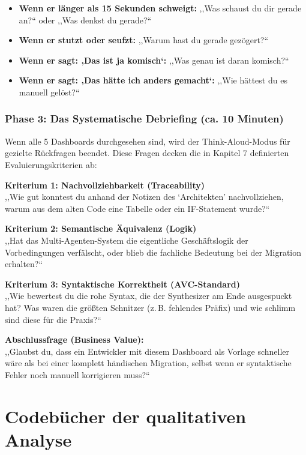 \documentclass[12pt, a4paper, oneside]{book}
\begin{document}
\begin{itemize}
    \item \textbf{Wenn er länger als 15 Sekunden schweigt:} ,,Was schaust du dir gerade an?`` oder ,,Was denkst du gerade?``
    \item \textbf{Wenn er stutzt oder seufzt:} ,,Warum hast du gerade gezögert?``
    \item \textbf{Wenn er sagt: ,Das ist ja komisch`:} ,,Was genau ist daran komisch?``
    \item \textbf{Wenn er sagt: ,Das hätte ich anders gemacht`:} ,,Wie hättest du es manuell gelöst?``
\end{itemize}

\subsection*{Phase 3: Das Systematische Debriefing (ca. 10 Minuten)}
Wenn alle 5 Dashboards durchgesehen sind, wird der Think-Aloud-Modus für gezielte Rückfragen beendet. Diese Fragen decken die in Kapitel 7 definierten Evaluierungskriterien ab:

\vspace{0.5em}
\noindent\textbf{Kriterium 1: Nachvollziehbarkeit (Traceability)}\\
,,Wie gut konntest du anhand der Notizen des `Architekten' nachvollziehen, warum aus dem alten Code eine Tabelle oder ein IF-Statement wurde?``

\vspace{0.5em}
\noindent\textbf{Kriterium 2: Semantische Äquivalenz (Logik)}\\
,,Hat das Multi-Agenten-System die eigentliche Geschäftslogik der Vorbedingungen verfälscht, oder blieb die fachliche Bedeutung bei der Migration erhalten?``

\vspace{0.5em}
\noindent\textbf{Kriterium 3: Syntaktische Korrektheit (AVC-Standard)}\\
,,Wie bewertest du die rohe Syntax, die der Synthesizer am Ende ausgespuckt hat? Was waren die größten Schnitzer (z.\,B. fehlendes Präfix) und wie schlimm sind diese für die Praxis?``

\vspace{0.5em}
\noindent\textbf{Abschlussfrage (Business Value):}\\
,,Glaubst du, dass ein Entwickler mit diesem Dashboard als Vorlage schneller wäre als bei einer komplett händischen Migration, selbst wenn er syntaktische Fehler noch manuell korrigieren muss?``
\chapter{Codebücher der qualitativen Analyse}
\end{document}
